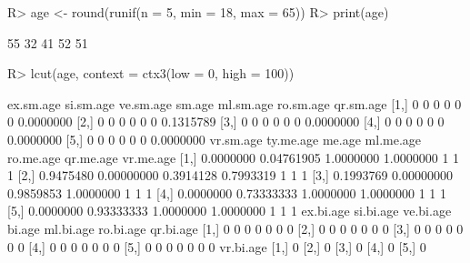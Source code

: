\documentclass{article}\usepackage[]{graphicx}\usepackage[]{color}
\begin{document}
\begin{Schunk}
% --begin: "lcut.numeric"
\begin{Sinput}
R> age <- round(runif(n = 5, min = 18, max = 65))
R> print(age)
\end{Sinput}
\begin{Soutput}
[1] 55 32 41 52 51
\end{Soutput}
\begin{Sinput}
R> lcut(age, context = ctx3(low = 0, high = 100))
\end{Sinput}
\begin{Soutput}
     ex.sm.age si.sm.age ve.sm.age sm.age ml.sm.age ro.sm.age qr.sm.age
[1,]         0         0         0      0         0         0 0.0000000
[2,]         0         0         0      0         0         0 0.1315789
[3,]         0         0         0      0         0         0 0.0000000
[4,]         0         0         0      0         0         0 0.0000000
[5,]         0         0         0      0         0         0 0.0000000
     vr.sm.age  ty.me.age    me.age ml.me.age ro.me.age qr.me.age vr.me.age
[1,] 0.0000000 0.04761905 1.0000000 1.0000000         1         1         1
[2,] 0.9475480 0.00000000 0.3914128 0.7993319         1         1         1
[3,] 0.1993769 0.00000000 0.9859853 1.0000000         1         1         1
[4,] 0.0000000 0.73333333 1.0000000 1.0000000         1         1         1
[5,] 0.0000000 0.93333333 1.0000000 1.0000000         1         1         1
     ex.bi.age si.bi.age ve.bi.age bi.age ml.bi.age ro.bi.age qr.bi.age
[1,]         0         0         0      0         0         0         0
[2,]         0         0         0      0         0         0         0
[3,]         0         0         0      0         0         0         0
[4,]         0         0         0      0         0         0         0
[5,]         0         0         0      0         0         0         0
     vr.bi.age
[1,]         0
[2,]         0
[3,]         0
[4,]         0
[5,]         0
\end{Soutput}
%
% --end: "lcut.numeric"
\end{Schunk}
\end{document}
